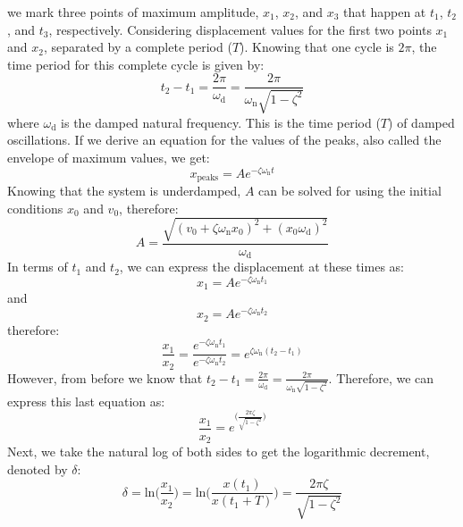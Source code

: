 \documentclass[12pt,letter]{article}
\numberwithin{ex}{section} %
\numberwithin{re}{section} %
\numberwithin{equation}{section}	%
\begin{document}
			\noindent we mark three points of maximum amplitude, $x_1$, $x_2$, and $x_3$ that happen at $t_1$, $t_2$, and $t_3$, respectively. Considering displacement values for the first two points $x_1$ and $x_2$, separated by a complete period ($T$).  Knowing that one cycle is $2 \pi$, the time period for this complete cycle is given by:
			\begin{equation}
				t_2-t_1 = \frac{2\pi}{\omega_\text{d}} = \frac{2\pi}{\omega_\text{n}\sqrt{1-\zeta^2}}
			\end{equation}				
			where $\omega_\text{d}$ is the damped natural frequency. This is the time period ($T$) of damped oscillations. If we derive an equation for the values of the peaks, also called the envelope of maximum values, we get: 
			\begin{equation}
				x_{\text{peaks}} = Ae^{-\zeta\omega_\text{n}t} 
			\end{equation} 		
			Knowing that the system is underdamped, $A$ can be solved for using the initial conditions $x_0$ and $v_0$, therefore: 
			\begin{equation}
				A = \frac{\sqrt{(v_0+\zeta\omega_\text{n}x_0)^2 + (x_0\omega_\text{d})^2}}{\omega_\text{d}}
			\end{equation} 	
			In terms of $t_1$ and $t_2$, we can express the displacement at these times as:
			\begin{equation}
				x_{\text{1}} = A e^{-\zeta \omega_\text{n} t_1}
			\end{equation}				
			and 
			\begin{equation}
				x_{\text{2}} = A e^{-\zeta \omega_\text{n} t_2}
			\end{equation}		
			therefore:
			\begin{equation}
				\frac{x_{\text{1}}}{x_{\text{2}}} = \frac{e^{-\zeta \omega_\text{n} t_1}}{e^{-\zeta \omega_\text{n} t_2}} = e^{\zeta \omega_\text{n}(t_2-t_1)}
			\end{equation}		
			However, from before we know that $t_2-t_1 = \frac{2\pi}{\omega_\text{d}} = \frac{2\pi}{\omega_\text{n}\sqrt{1-\zeta^2}}$. Therefore, we can express this last equation as:
			\begin{equation}
				\frac{x_{\text{1}}}{x_{\text{2}}} =e^{\Big(\frac{2 \pi \zeta}{\sqrt{1-\zeta^2}}\Big)}
			\end{equation}			
			Next, we take the natural log of both sides to get the logarithmic decrement, denoted by $\delta$:
			\begin{equation}
				\delta = \text{ln}\bigg(\frac{x_{\text{1}}}{x_{\text{2}}}\bigg) = \text{ln}\bigg(\frac{x(t_{\text{1}})}{x(t_{\text{1}}+T)}\bigg) = \frac{2 \pi \zeta}{\sqrt{1-\zeta^2}}
			\end{equation}				
\end{document}
